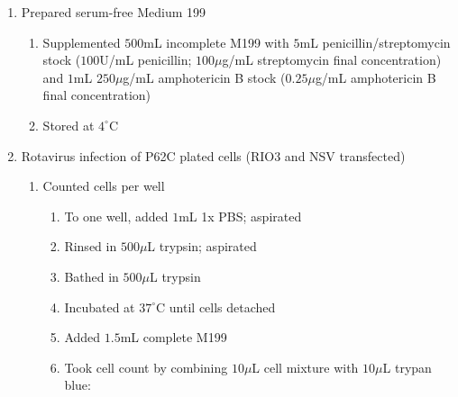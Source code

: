 \begin{enumerate}
	\item Prepared serum-free Medium 199
		\begin{enumerate}
			\item Supplemented $500$mL incomplete M199 with $5$mL penicillin/streptomycin stock ($100$U/mL penicillin; $100\mu$g/mL streptomycin final concentration) and $1$mL $250\mu$g/mL amphotericin B stock ($0.25\mu$g/mL amphotericin B final concentration)
			\item Stored at $4^{\circ}$C
		\end{enumerate}
	\item Rotavirus infection of P62C plated cells (RIO3 and NSV transfected)
		\begin{enumerate}
			\item Counted cells per well
				\begin{enumerate}
					\item To one well, added $1$mL 1x PBS; aspirated
					\item Rinsed in $500\mu$L trypsin; aspirated
					\item Bathed in $500\mu$L trypsin
					\item Incubated at $37^{\circ}$C until cells detached
					\item Added $1.5$mL complete M199
					\item Took cell count by combining $10\mu$L cell mixture with $10\mu$L trypan blue:
			

\end{enumerate}
\end{enumerate}
\end{enumerate}
